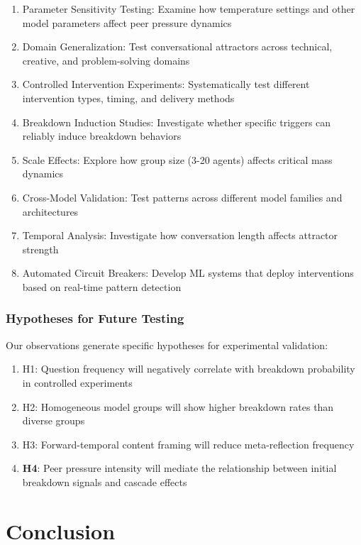 \documentclass[11pt,letterpaper]{article}
\begin{document}
\begin{enumerate}
    \item Parameter Sensitivity Testing: Examine how temperature settings and other model parameters affect peer pressure dynamics
    \item Domain Generalization: Test conversational attractors across technical, creative, and problem-solving domains
    \item Controlled Intervention Experiments: Systematically test different intervention types, timing, and delivery methods
    \item Breakdown Induction Studies: Investigate whether specific triggers can reliably induce breakdown behaviors
    \item Scale Effects: Explore how group size (3-20 agents) affects critical mass dynamics
    \item Cross-Model Validation: Test patterns across different model families and architectures
    \item Temporal Analysis: Investigate how conversation length affects attractor strength
    \item Automated Circuit Breakers: Develop ML systems that deploy interventions based on real-time pattern detection
\end{enumerate}

\subsubsection{Hypotheses for Future Testing}

Our observations generate specific hypotheses for experimental validation:

\begin{enumerate}
    \item H1: Question frequency will negatively correlate with breakdown probability in controlled experiments
    \item H2: Homogeneous model groups will show higher breakdown rates than diverse groups
    \item H3: Forward-temporal content framing will reduce meta-reflection frequency
    \item \textbf{H4}: Peer pressure intensity will mediate the relationship between initial breakdown signals and cascade effects
\end{enumerate}

\section{Conclusion}
\end{document}
